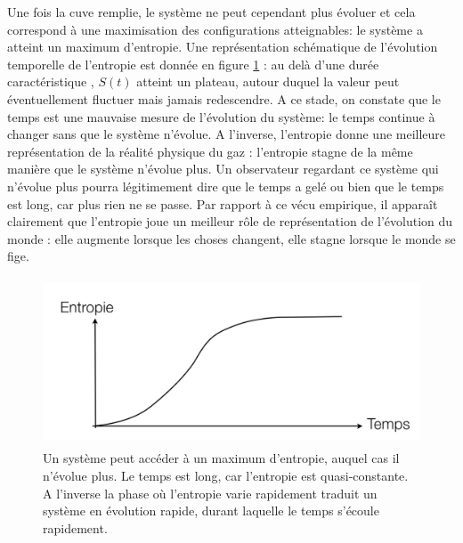 Une fois la cuve remplie, le système ne peut cependant plus évoluer et cela correspond à une maximisation des configurations atteignables: le système a atteint un maximum d'entropie. Une représentation schématique de l'évolution temporelle de l'entropie est donnée en figure \ref{f:equitemps} : au delà d'une durée caractéristique , $S(t)$ atteint un plateau, autour duquel la valeur peut éventuellement fluctuer mais jamais redescendre. A ce stade, on constate que le temps est une mauvaise mesure de l'évolution du système: le temps continue à changer sans que le système n'évolue. A l'inverse, l'entropie donne une meilleure représentation de la réalité physique du gaz : l'entropie stagne de la même manière que le système n'évolue plus. Un observateur regardant ce système qui n'évolue plus pourra légitimement dire que le temps a gelé ou bien que le temps est long, car plus rien ne se passe. Par rapport à ce vécu empirique, il apparaît clairement que l'entropie joue un meilleur rôle de représentation de l'évolution du monde : elle augmente lorsque les choses changent, elle stagne lorsque le monde se fige. 
\begin{figure}[htbp]
	\centering
		\includegraphics[height=5cm]{figs/equientro.png}
	\caption[Evolution vers un maximum d'entropie]{Un système peut accéder à un maximum d'entropie, auquel cas il n'évolue plus. Le temps est long, car l'entropie est quasi-constante. A l'inverse la phase où l'entropie varie rapidement traduit un système en évolution rapide, durant laquelle le temps s'écoule rapidement.}
	\label{f:equitemps}
\end{figure}

